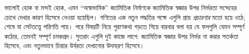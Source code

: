 \documentclass[../../../include/open-logic-section]{subfiles}
\begin{document}
ভালোই হোক
বা মন্দই
হোক,
এমন
“অস্বাভাবিক”
জ্যামিতিক
নির্মাণকে
জ্যামিতিক
স্বজ্ঞার
উপর
নির্ভরতা
সন্দেহের
চোখে
দেখার
কারণ
হিসেবে
নেওয়া
হয়েছিল।
গণিতের
এক নতুন
পদ্ধতির
পক্ষে
এগুলি
প্রায়
\emph{প্রচারণার}
মতো হয়ে
ওঠে;
শেষে
যা
সেটতত্ত্বে
পরিণতি
পায়।
পরে
বিষয়টি
নিয়ে
পুরাণকথা
গড়তে
গিয়ে
বারবার
বলা
হয় যে
ফলগুলি
যেমন
সম্পূর্ণ
কঠোর,
তেমনই
সম্পূর্ণ
চমকপ্রদ।
সুতরাং
এগুলি
দুই
কাজে
লাগে:
জ্যামিতিক
স্বজ্ঞার
উপর
নির্ভর
না করার
সতর্কতা
হিসেবে,
এবং
নতুনভাবে
চিন্তার
উর্বরতা
দেখানোর
উদাহরণ
হিসেবে।
\end{document}
